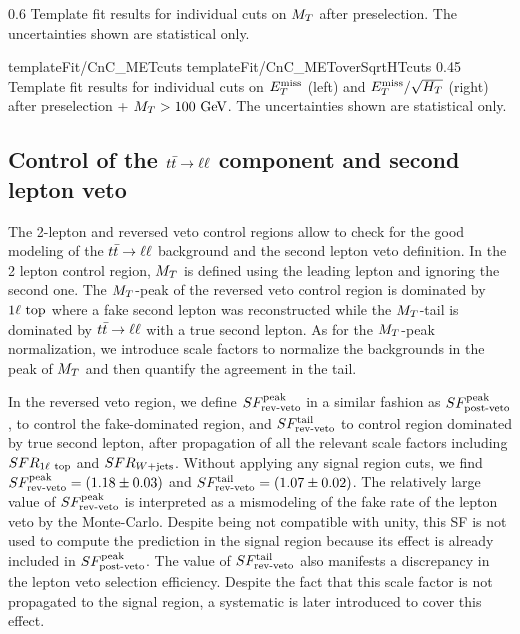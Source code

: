                      {0.6}
                     {Template fit results for individual cuts on $M_T$ after
                     preselection. The uncertainties shown are statistical only.}

                         {templateFit/CnC_METcuts}
                         {templateFit/CnC_METoverSqrtHTcuts}
                         {0.45}
                         {Template fit results for individual cuts on $E_T^\text{miss}$ (left)
                         and $E_T^\text{miss}/\sqrt{H_T}$ (right) after preselection + $M_T > 100~\text{GeV}$.
                         The uncertainties shown are statistical only.}

        \subsection{Control of the $t\bar{t} \rightarrow \ell \ell$ component and second lepton veto \label{sec:analysis_controlDileptonTop}}

        The 2-lepton and reversed veto control regions allow to check for the good modeling
        of the $t\bar{t} \rightarrow \ell \ell$ background and the second lepton veto definition. In the
        2 lepton control region, $M_T$ is defined using the leading lepton and ignoring
        the second one. The $M_T$-peak of the reversed veto control region is dominated by
        $1\ell~\text{top}$ where a fake second lepton was reconstructed while the $M_T$-tail
        is dominated by $t\bar{t} \rightarrow \ell \ell$ with a true second lepton. As for the $M_T$-peak
        normalization, we introduce scale factors to normalize the backgrounds in the peak
        of $M_T$ and then quantify the agreement in the tail.

        In the reversed veto region, we define $SF_{\text{rev-veto}}^{\text{peak}}$ in a similar fashion as $SF_{\text{post-veto}}^{\text{peak}}$,
        to control the fake-dominated region, and $SF_{\text{rev-veto}}^{\text{tail}}$ to control region dominated
        by true second lepton, after propagation of all the relevant scale factors including
        $SFR_{1\ell~\text{top}}$ and $SFR_{\text{$W$+jets}}$.
        Without applying any signal region cuts, we find $SF_{\text{rev-veto}}^{\text{peak}} = (1.18 \pm 0.03)$ and
        $SF_{\text{rev-veto}}^{\text{tail}} = (1.07 \pm 0.02)$. The relatively large value of $SF_{\text{rev-veto}}^{\text{peak}}$ is
        interpreted as a mismodeling of the fake rate of the lepton veto by the Monte-Carlo.
        Despite being not compatible with unity, this SF is not used to compute the prediction
        in the signal region because its effect is already included in $SF_{\text{post-veto}}^{\text{peak}}$. The
        value of $SF_{\text{rev-veto}}^{\text{tail}}$ also manifests a discrepancy in the lepton veto selection
        efficiency. Despite the fact that this scale factor is not propagated to the
        signal region, a systematic is later introduced to cover this effect.

